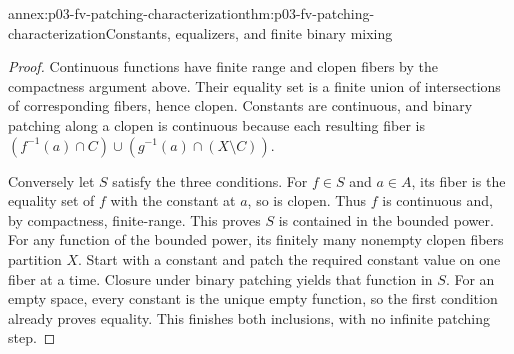 \begin{annexitem}{annex:p03-fv-patching-characterization}{thm:p03-fv-patching-characterization}{Constants, equalizers, and finite binary mixing}
\begin{proof}
Continuous functions have finite range and clopen fibers by the compactness
argument above. Their equality set is a finite union of intersections of
corresponding fibers, hence clopen. Constants are continuous, and binary
patching along a clopen is continuous because each resulting fiber is
\((f^{-1}(a)\cap C)\cup(g^{-1}(a)\cap(X\setminus C))\).

Conversely let \(S\) satisfy the three conditions. For \(f\in S\)
and \(a\in A\), its fiber is the equality set of \(f\) with the
constant at \(a\), so is clopen. Thus \(f\) is continuous and, by
compactness, finite-range. This proves \(S\) is contained in the bounded
power. For any function of the bounded power, its finitely many nonempty
clopen fibers partition \(X\). Start with a constant and patch the required
constant value on one fiber at a time. Closure under binary patching yields
that function in \(S\). For an empty space, every constant is the unique
empty function, so the first condition already proves equality. This finishes
both inclusions, with no infinite patching step.
\end{proof}
\end{annexitem}

